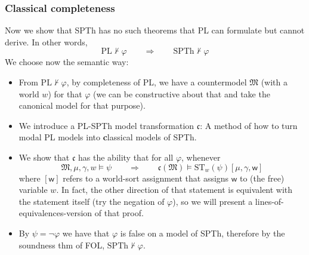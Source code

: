 \documentclass[xcolor=x11names]{beamer}
\begin{document}
\begin{frame}[t]
\frametitle{Classical completeness}
\footnotesize
Now we show that SPTh has no such theorems that PL can formulate but cannot derive. In other words,
\[ \mathrm{PL}\not \vdash \varphi \qquad \mathrel{\Longrightarrow} \qquad \mathrm{SPTh}\not \vdash \varphi  \]
We choose now the semantic way:
\begin{itemize}
\item From $\mathrm{PL}\not \vdash \varphi$, by completeness of PL, we have a countermodel $\mathfrak M$ (with a world $w$) for that $\varphi$ (we can be constructive about that and take the canonical model for that purpose).
\item We introduce a PL-SPTh model transformation $\mathfrak c$: A method of how to turn modal PL models into \textbf classical models of SPTh.
\item We show that $\mathfrak c$ has the ability that for all $\varphi$, whenever
\[ \mathfrak M, \mu, \gamma, w \models \psi \qquad \mathrel{\Longrightarrow} \qquad \mathfrak c(\mathfrak M) \models \mathrm {ST}_w(\psi) [\mu, \gamma, \mathsf w] \]
where $[\mathsf w]$ refers to a world-sort assignment that assigns $\mathsf w$ to (the free) variable $w$. In fact, the other direction of that statement is equivalent with the statement itself (try the negation of $\varphi$), so we will present a lines-of-equivalences-version of that proof.
\item By $\psi=\lnot \varphi$ we have that $\varphi$ is false on a model of SPTh, therefore by the soundness thm of FOL, $\mathrm{SPTh}\not \vdash \varphi$.
\end{itemize}
\end{frame}
\end{document}

